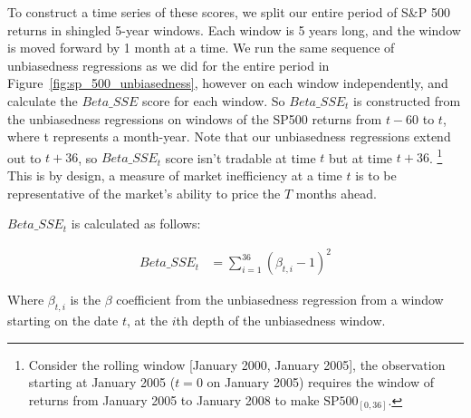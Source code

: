 To construct a time series of these scores, we split our entire period of S\&P 500 returns in shingled 5-year windows. Each window is 5 years long, and the window is moved forward by 1 month at a time.
We run the same sequence of unbiasedness regressions as we did for the entire period in Figure~\ref{fig:sp_500_unbiasedness}, however on each window independently, and calculate the $Beta\_SSE$ score for each window.
So $Beta\_SSE_t$ is constructed from the unbiasedness regressions on windows of the SP500 returns from $t-60$ to $t$, where t represents a month-year.
 Note that our unbiasedness regressions extend out to $t+36$, so $Beta\_SSE_t$ score isn't tradable at time $t$ but at time $t+36$.
\footnote{Consider the rolling window [January 2000, January 2005], the observation starting at January 2005 ($t=0$ on January 2005) requires the window of returns from January 2005 to January 2008 to make $\mathrm{SP500}_{[0, 36]}$.}
This is by design, a measure of market inefficiency at a time $t$ is to be representative of the market's ability to price the $T$ months ahead.

$Beta\_SSE_t$ is calculated as follows:

\begin{equation}
    \begin{aligned}
        Beta\_SSE_t &= \sum_{i=1}^{36} (\beta_{t,i} - 1)^2
    \end{aligned}
\end{equation}
\label{eq:beta_sse}

Where $\beta_{t,i}$ is the $\beta$ coefficient from the unbiasedness regression from a 
window starting on the date $t$, at the $i$th depth of the unbiasedness window.

